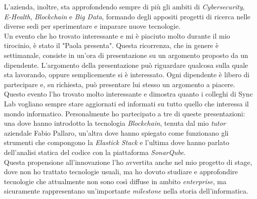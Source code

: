 L'azienda, inoltre, sta approfondendo sempre di più gli ambiti di \textit{Cybersecurity}, \textit{E-Health}, \textit{Blockchain} e \textit{Big Data}, formando degli appositi progetti di ricerca nelle diverse sedi per sperimentare e imparare nuove tecnologie. \\

Un evento che ho trovato interessante e mi è piaciuto molto durante il mio tirocinio, è stato il "Paola presenta". 
Questa ricorrenza, che in genere è settimanale, consiste in un'ora di presentazione su un argomento proposto da un dipendente. L'argomento della presentazione può riguardare qualcosa sulla quale sta lavorando, oppure semplicemente si è interessato. 
Ogni dipendente è libero di partecipare e, su richiesta, può presentare lui stesso un argomento a piacere. Questo evento l'ho trovato molto interessante e dimostra quanto i colleghi di Sync Lab vogliano sempre stare aggiornati ed informati su tutto quello che interessa il mondo informatico. 
Personalmente ho partecipato a tre di queste presentazioni: una dove hanno introdotto la tecnologia \textit{Blockchain}, tenuta dal mio \textit{tutor} aziendale Fabio Pallaro, un'altra dove hanno spiegato come funzionano gli strumenti che compongono la \textit{Elastick Stack} e l'ultima dove hanno parlato dell'analisi statica del codice con la piattaforma \textit{SonarQube}. \\

Questa propensione all'innovazione l'ho avvertita anche nel mio progetto di stage, dove non ho trattato tecnologie usuali, ma ho dovuto studiare e approfondire tecnologie che attualmente non sono così diffuse in ambito \textit{enterprise}, ma sicuramente rappresentano un'importante \textit{milestone} nella storia dell'informatica.
